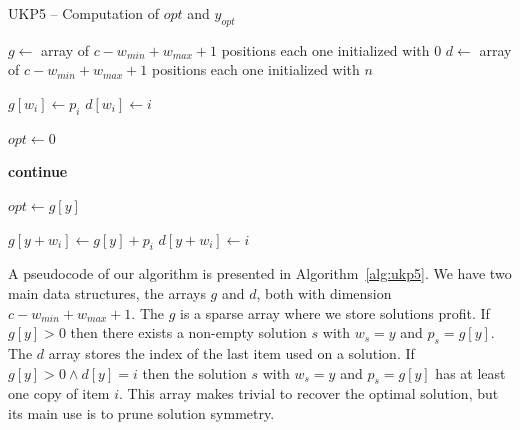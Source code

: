 \documentclass[runningheads,a4paper]{llncs}
\begin{document}
\begin{algorithm}[!t]
\caption{UKP5 -- Computation of $opt$ and $y_{opt}$}\label{alg:ukp5}
\begin{algorithmic}[1]
  \State \(g \gets\) array of \(c - w_{min} + w_{max} + 1\) positions each one initialized with \(0\)\label{create_g}
  \State \(d \gets\) array of \(c - w_{min} + w_{max} + 1\) positions each one initialized with \(n\)\label{create_d}
  
  \label{begin_trivial_bounds}
      \State \(g[w_i] \gets p_i\)
      \State \(d[w_i] \gets i\)
    \EndIf
  \EndFor\label{end_trivial_bounds}

  \State \(opt \gets 0\)\label{init_opt}

  \label{main_ext_loop_begin}
    \label{if_less_than_opt_begin}
    	\State \textbf{continue}\label{alg:continue}
    \EndIf\label{if_less_than_opt_end}
    
    \State \(opt \gets g[y]\)\label{update_opt}
    
    \label{main_inner_loop_begin}
      \label{if_new_lower_bound_begin}
        \State \(g[y + w_i] \gets g[y] + p_i\)
        \State \(d[y + w_i] \gets i\)
      \EndIf\label{if_new_lower_bound_end}
    \EndFor\label{main_inner_loop_end}
  \EndFor\label{main_ext_loop_end}

\EndProcedure
\end{algorithmic}
\end{algorithm}

A pseudocode of our algorithm is presented in Algorithm~\ref{alg:ukp5}.
We have two main data structures, the arrays \(g\) and \(d\), both with dimension $c - w_{min} + w_{max} + 1$. 
The \(g\) is a sparse array where we store solutions profit. If \(g[y] > 0\) then there exists a non-empty solution \(s\) with \(w_s = y\) and \(p_s = g[y]\). 
The \(d\) array stores the index of the last item used on a solution. If \(g[y] > 0 \land d[y] = i\) then the solution \(s\) with \(w_s = y\) and \(p_s = g[y]\) has at least one copy of item \(i\). 
This array makes trivial to recover the optimal solution, but its main use is to prune solution symmetry.
\end{document}
